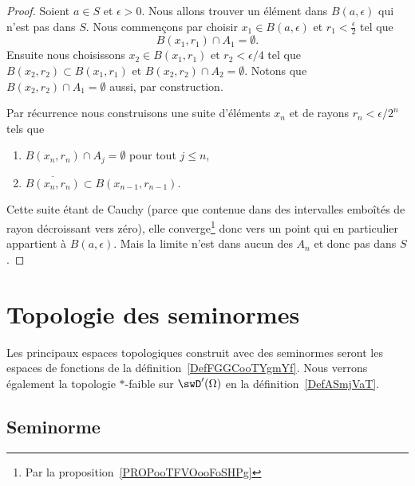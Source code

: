 \begin{proof}
	Soient \( a\in S\) et \( \epsilon>0\). Nous allons trouver un élément dans \( B(a,\epsilon)\) qui n'est pas dans \( S\). Nous commençons par choisir \( x_1\in B(a,\epsilon)\) et \( r_1<\frac{ \epsilon }{2}\) tel que
	\begin{equation}
		B(x_1,r_1)\cap A_1=\emptyset.
	\end{equation}
	Ensuite nous choisissons \( x_2\in B(x_1,r_1)\) et \( r_2<\epsilon/4\) tel que \( B(x_2,r_2)\subset B(x_1,r_1)\) et \( B(x_2,r_2)\cap A_2=\emptyset\). Notons que \( B(x_2,r_2)\cap A_1=\emptyset\) aussi, par construction.

	Par récurrence nous construisons une suite d'éléments \( x_n\) et de rayons \( r_n<\epsilon/2^n\) tels que
	\begin{enumerate}
		\item
		      \( B(x_n,r_n)\cap A_j=\emptyset\) pour tout \( j\leq n\),
		\item
		      \( \overline{ B(x_n,r_n) }\subset B(x_{n-1},r_{n-1})\).
	\end{enumerate}
	Cette suite étant de Cauchy (parce que contenue dans des intervalles emboîtés de rayon décroissant vers zéro), elle converge\footnote{Par la proposition~\ref{PROPooTFVOooFoSHPg}} donc vers un point qui en particulier appartient à \( B(a,\epsilon)\). Mais la limite n'est dans aucun des \( A_n\) et donc pas dans \( S\).
\end{proof}

\section{Topologie des seminormes}

Les principaux espaces topologiques construit avec des seminormes seront les espaces de fonctions de la définition~\ref{DefFGGCooTYgmYf}. Nous verrons également la topologie \( *\)-faible sur \( \swD'(\Omega)\) en la définition~\ref{DefASmjVaT}.

\subsection{Seminorme}

